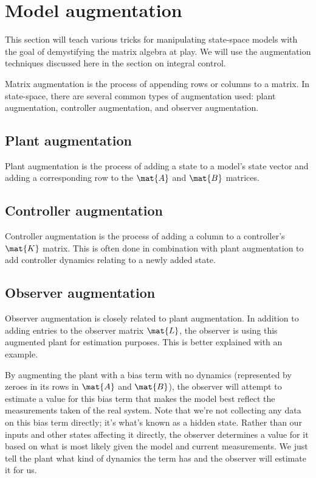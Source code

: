 \section{Model augmentation}

This section will teach various tricks for manipulating state-space
\glspl{model} with the goal of demystifying the matrix algebra at play. We will
use the augmentation techniques discussed here in the section on integral
control.

Matrix augmentation is the process of appending rows or columns to a matrix. In
state-space, there are several common types of augmentation used: \gls{plant}
augmentation, controller augmentation, and \gls{observer} augmentation.

\subsection{Plant augmentation}

Plant augmentation is the process of adding a state to a model's state vector
and adding a corresponding row to the $\mat{A}$ and $\mat{B}$ matrices.

\subsection{Controller augmentation}

Controller augmentation is the process of adding a column to a controller's
$\mat{K}$ matrix. This is often done in combination with \gls{plant}
augmentation to add controller dynamics relating to a newly added \gls{state}.

\subsection{Observer augmentation}

Observer augmentation is closely related to \gls{plant} augmentation. In
addition to adding entries to the \gls{observer} matrix $\mat{L}$, the
\gls{observer} is using this augmented \gls{plant} for estimation purposes. This
is better explained with an example.

By augmenting the \gls{plant} with a bias term with no dynamics (represented by
zeroes in its rows in $\mat{A}$ and $\mat{B}$), the \gls{observer} will attempt
to estimate a value for this bias term that makes the \gls{model} best reflect
the measurements taken of the real \gls{system}. Note that we're not collecting
any data on this bias term directly; it's what's known as a hidden \gls{state}.
Rather than our \glspl{input} and other \glspl{state} affecting it directly, the
\gls{observer} determines a value for it based on what is most likely given the
\gls{model} and current measurements. We just tell the \gls{plant} what kind of
dynamics the term has and the \gls{observer} will estimate it for us.

